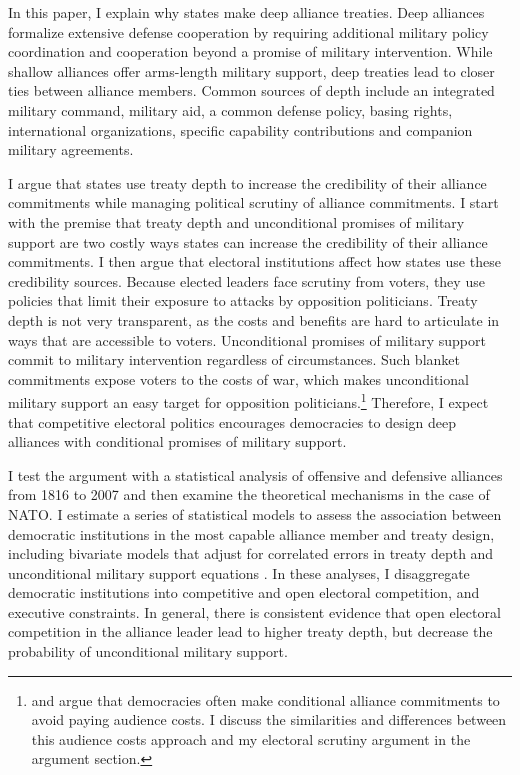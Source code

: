 \documentclass[12pt]{article}
\begin{document}
In this paper, I explain why states make deep alliance treaties. 
Deep alliances formalize extensive defense cooperation by requiring additional military policy coordination and cooperation beyond a promise of military intervention. 
While shallow alliances offer arms-length military support, deep treaties lead to closer ties between alliance members. 
Common sources of depth include an integrated military command, military aid, a common defense policy, basing rights, international organizations, specific capability contributions and companion military agreements. 


I argue that states use treaty depth to increase the credibility of their alliance commitments while managing political scrutiny of alliance commitments.
I start with the premise that treaty depth and unconditional promises of military support are two costly ways states can increase the credibility of their alliance commitments.
I then argue that electoral institutions affect how states use these credibility sources.
Because elected leaders face scrutiny from voters, they use policies that limit their exposure to attacks by opposition politicians.
Treaty depth is not very transparent, as the costs and benefits are hard to articulate in ways that are accessible to voters. 
Unconditional promises of military support commit to military intervention regardless of circumstances.  
Such blanket commitments expose voters to the costs of war, which makes unconditional military support an easy target for opposition politicians.\footnote{\citet{Mattes2012} \citet{Chibaetal2015} and \citet{FjelstulReiter2019} argue that democracies often make conditional alliance commitments to avoid paying audience costs. I discuss the similarities and differences between this audience costs approach and my electoral scrutiny argument in the argument section.} 
Therefore, I expect that competitive electoral politics encourages democracies to design deep alliances with conditional promises of military support. 


I test the argument with a statistical analysis of offensive and defensive alliances from 1816 to 2007 and then examine the theoretical mechanisms in the case of NATO.
I estimate a series of statistical models to assess the association between democratic institutions in the most capable alliance member and treaty design, including bivariate models that adjust for correlated errors in treaty depth and unconditional military support equations \citep{Braumoelleretal2018}. 
In these analyses, I disaggregate democratic institutions into competitive and open electoral competition, and executive constraints.
In general, there is consistent evidence that open electoral competition in the alliance leader lead to higher treaty depth, but decrease the probability of unconditional military support. 
\end{document}
